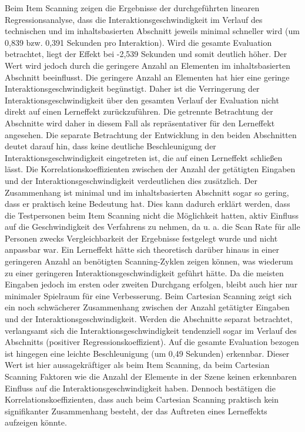 Beim Item Scanning zeigen die Ergebnisse der durchgeführten linearen Regressionsanalyse, dass die Interaktionsgeschwindigkeit im Verlauf des technischen und im inhaltsbasierten Abschnitt jeweils minimal schneller wird (um 0,839 bzw. 0,391 Sekunden pro Interaktion). Wird die gesamte Evaluation betrachtet, liegt der Effekt bei -2,539 Sekunden und somit deutlich höher. Der Wert wird jedoch durch die geringere Anzahl an Elementen im inhaltsbasierten Abschnitt beeinflusst. Die geringere Anzahl an Elementen hat hier eine geringe Interaktionsgeschwindigkeit begünstigt. Daher ist die Verringerung der Interaktionsgeschwindigkeit über den gesamten Verlauf der Evaluation nicht direkt auf einen Lerneffekt zurückzuführen. Die getrennte Betrachtung der Abschnitte wird daher in diesem Fall als repräsentativer für den Lerneffekt angesehen. Die separate Betrachtung der Entwicklung in den beiden Abschnitten deutet darauf hin, dass keine deutliche Beschleunigung der Interaktionsgeschwindigkeit eingetreten ist, die auf einen Lerneffekt schließen lässt. Die Korrelationskoeffizienten zwischen der Anzahl der getätigten Eingaben und der Interaktionsgeschwindigkeit verdeutlichen dies zusätzlich. Der Zusammenhang ist minimal und im inhaltsbasierten Abschnitt sogar so gering, dass er praktisch keine Bedeutung hat. Dies kann dadurch erklärt werden, dass die Testpersonen beim Item Scanning nicht die Möglichkeit hatten, aktiv Einfluss auf die Geschwindigkeit des Verfahrens zu nehmen, da u. a. die Scan Rate für alle Personen zwecks Vergleichbarkeit der Ergebnisse festgelegt wurde und nicht anpassbar war. Ein Lerneffekt hätte sich theoretisch darüber hinaus in einer geringeren Anzahl an benötigten Scanning-Zyklen zeigen können, was wiederum zu einer geringeren Interaktionsgeschwindigkeit geführt hätte. Da die meisten Eingaben jedoch im ersten oder zweiten Durchgang erfolgen, bleibt auch hier nur minimaler Spielraum für eine Verbesserung.
Beim Cartesian Scanning zeigt sich ein noch schwächerer Zusammenhang zwischen der Anzahl getätigter Eingaben und der Interaktionsgeschwindigkeit. Werden die Abschnitte separat betrachtet, verlangsamt sich die Interaktionsgeschwindigkeit tendenziell sogar im Verlauf des Abschnitts (positiver Regressionskoeffizient). Auf die gesamte Evaluation bezogen ist hingegen eine leichte Beschleunigung (um 0,49 Sekunden) erkennbar. Dieser Wert ist hier aussagekräftiger als beim Item Scanning, da beim Cartesian Scanning Faktoren wie die Anzahl der Elemente in der Szene keinen erkennbaren Einfluss auf die Interaktionsgeschwindigkeit haben. Dennoch bestätigen die Korrelationskoeffizienten, dass auch beim Cartesian Scanning praktisch kein signifikanter Zusammenhang besteht, der das Auftreten eines Lerneffekts aufzeigen könnte.


